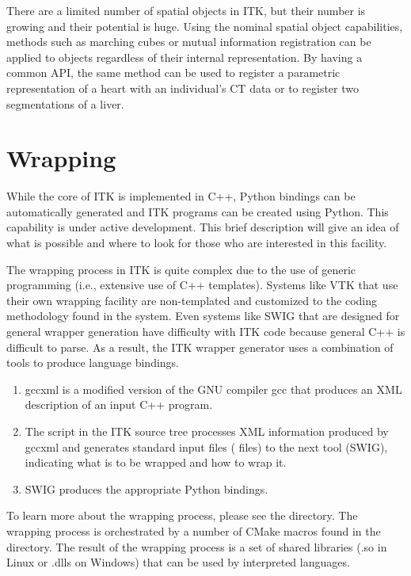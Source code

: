 There are a limited number of spatial objects in ITK, but
their number is growing and their potential is huge. Using the nominal
spatial object capabilities, methods such as marching cubes or mutual
information registration can be applied to objects regardless of their
internal representation. By having a common API, the same method can be used
to register a parametric representation of a heart with an individual's CT
data or to register two segmentations of a liver.


\section{Wrapping}
\label{sec:Wrapping}


While the core of ITK is implemented in C++, Python bindings can be
automatically generated and ITK programs can be created using Python.
This capability is under active development. This brief description
will give an idea of what is possible and where to look for those who are
interested in this facility.

The wrapping process in ITK is quite complex due to the use of generic
programming (i.e., extensive use of C++ templates). Systems like VTK that use
their own wrapping facility are non-templated and customized to the coding
methodology found in the system. Even systems like SWIG that are designed
for general wrapper generation have difficulty with ITK code because general
C++ is difficult to parse. As a result, the ITK wrapper generator uses a
combination of tools to produce language bindings.

\begin{enumerate}
  \item gccxml is a modified version of the GNU compiler gcc that
    produces an XML description of an input C++ program.
  \item The  script in the ITK source tree processes XML
    information produced by gccxml and generates standard input files
    ( files) to the next tool (SWIG), indicating what is to be wrapped
    and how to wrap it.
  \item SWIG produces the appropriate Python bindings.
\end{enumerate}

To learn more about the wrapping process, please see the 
directory. The wrapping process is orchestrated by a number of CMake macros
found in the  directory. The result of the wrapping process is
a set of shared libraries (.so in Linux or .dlls on Windows) that can be used
by interpreted languages.

